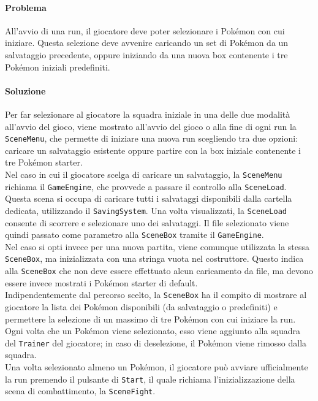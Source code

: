 \documentclass[a4paper,12pt]{report}
\begin{document}
{{\paragraph{Problema} 
All'avvio di una run, il giocatore deve poter selezionare i Pokémon con cui iniziare. Questa selezione deve avvenire caricando un set di Pokémon da un salvataggio precedente, oppure iniziando da una nuova box contenente i tre Pokémon iniziali predefiniti.
\paragraph{Soluzione}
Per far selezionare al giocatore la squadra iniziale in una delle due modalità all'avvio del gioco, viene mostrato all'avvio del gioco o alla fine di ogni run la \texttt{SceneMenu}, che permette di iniziare una nuova run scegliendo tra due opzioni: caricare un salvataggio esistente oppure partire con la box iniziale contenente i tre Pokémon starter.\\
Nel caso in cui il giocatore scelga di caricare un salvataggio, la \texttt{SceneMenu} richiama il \texttt{GameEngine}, che provvede a passare il controllo alla \texttt{SceneLoad}. Questa scena si occupa di caricare tutti i salvataggi disponibili dalla cartella dedicata, utilizzando il \texttt{SavingSystem}. Una volta visualizzati, la \texttt{SceneLoad} consente di scorrere e selezionare uno dei salvataggi. Il file selezionato viene quindi passato come parametro alla \texttt{SceneBox} tramite il \texttt{GameEngine}.\\
Nel caso si opti invece per una nuova partita, viene comunque utilizzata la stessa \texttt{SceneBox}, ma inizializzata con una stringa vuota nel costruttore. Questo indica alla \texttt{SceneBox} che non deve essere effettuato alcun caricamento da file, ma devono essere invece mostrati i Pokémon starter di default.\\
Indipendentemente dal percorso scelto, la \texttt{SceneBox} ha il compito di mostrare al giocatore la lista dei Pokémon disponibili (da salvataggio o predefiniti) e permettere la selezione di un massimo di tre Pokémon con cui iniziare la run. Ogni volta che un Pokémon viene selezionato, esso viene aggiunto alla squadra del \texttt{Trainer} del giocatore; in caso di deselezione, il Pokémon viene rimosso dalla squadra.\\
Una volta selezionato almeno un Pokémon, il giocatore può avviare ufficialmente la run premendo il pulsante di \texttt{Start}, il quale richiama l'inizializzazione della scena di combattimento, la \texttt{SceneFight}.

}}
\end{document}
